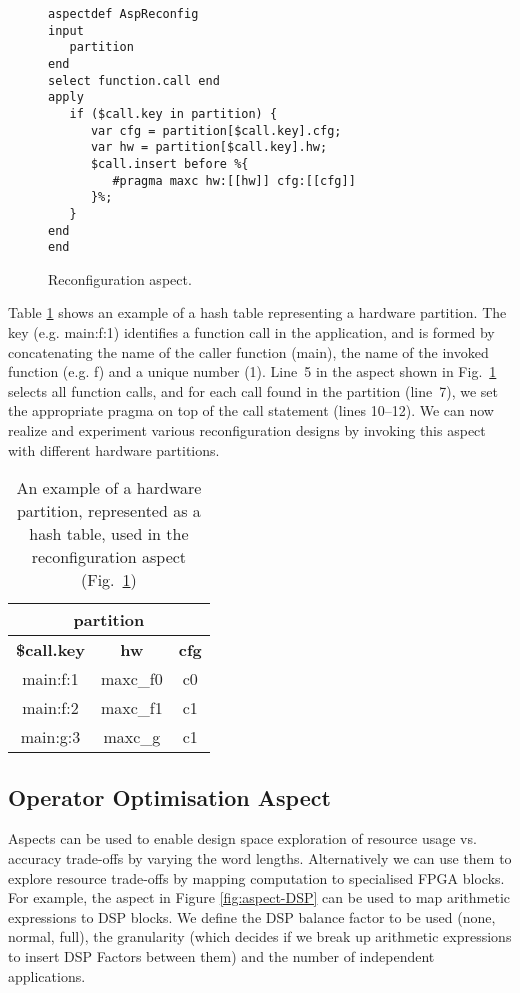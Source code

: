 \lstset{style=lara}
\begin{figure}[!h]
\begin{lstlisting}
aspectdef AspReconfig
input
   partition
end
select function.call end
apply
   if ($call.key in partition) {
      var cfg = partition[$call.key].cfg;
      var hw = partition[$call.key].hw;
      $call.insert before %{
         #pragma maxc hw:[[hw]] cfg:[[cfg]]
      }%;
   }
end
end
\end{lstlisting}
\caption{Reconfiguration aspect.}
\label{fig:aspect-reconf}
\end{figure}

Table \ref{fig:aspect-hash} shows an example of a hash table representing 
a hardware partition. The key (e.g. main:f:1) identifies a function call in the application, and is
formed by concatenating the name of the caller function (main), the name of the invoked function (e.g. f) and a
unique number (1).  Line~5 in the aspect shown in Fig.~\ref{fig:aspect-reconf} selects all function calls,
and for each call found in the partition (line~7), we set the
appropriate pragma on top of the call statement (lines 10--12). We can now realize and experiment 
various reconfiguration designs by invoking this aspect with different hardware partitions.


\begin{table}[!h]
\caption{An example of a hardware partition, represented as a hash table, used in the reconfiguration aspect (Fig.~\ref{fig:aspect-reconf})}
\label{fig:aspect-hash}
\centering
\begin{tabular}{c|c|c}
\hline
\multicolumn{3}{c}{\bf{partition}} \\
\hline
\bf{\$call.key} & \bf{hw} & \bf{cfg}  \\
\hline
main:f:1 & maxc\_f0 & c0 \\
main:f:2 & maxc\_f1 & c1 \\
main:g:3 & maxc\_g & c1 \\
\hline
\end{tabular}
\end{table}

\subsection{Operator Optimisation Aspect}
\label{sect:asp_ops}
Aspects can be used to enable design space exploration of resource
usage vs. accuracy trade-offs by varying the word
lengths. Alternatively we can use them to explore resource trade-offs
by mapping computation to specialised FPGA blocks. For example, the
aspect in Figure \ref{fig:aspect-DSP} can be used to map arithmetic
expressions to DSP blocks. We define the DSP balance factor to be used
(none, normal, full), the granularity (which decides if we break up
arithmetic expressions to insert DSP Factors between them) and the
number of independent applications.


